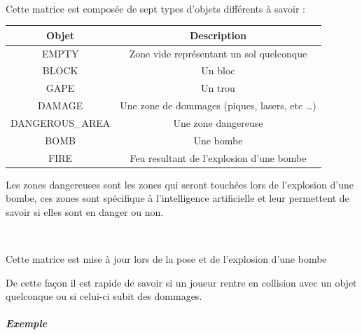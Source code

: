 			$\,$
			
			Cette matrice est composée de sept types d'objets différents à savoir :
			
			\begin{center}
				\begin{tabular}{|c|c|} \hline
				Objet  & Description \\\hline
				EMPTY  & Zone vide représentant un sol quelconque\\\hline
				BLOCK  & Un bloc \\\hline
				GAPE   & Un trou \\\hline
				DAMAGE & Une zone de dommages (piques, lasers, etc \ldots) \\\hline
				DANGEROUS\_AREA & Une zone dangereuse\\\hline
				BOMB & Une bombe\\\hline
				FIRE & Feu resultant de l'explosion d'une bombe\\\hline
				\end{tabular}
			\end{center}
			
			Les zones dangereuses sont les zones qui seront touchées lors de l'explosion
			d'une bombe, ces zones sont spécifique à l'intelligence artificielle et leur
			permettent de savoir si elles sont en danger ou non.
			
			
			$\,$
			
			Cette matrice est mise à jour lors de la pose et de l'explosion d'une bombe
			
			De cette façon il est rapide de savoir si un joueur rentre en collision avec
			un objet quelconque ou si celui-ci subit des dommages.
			
			\subparagraph{Exemple}
			
